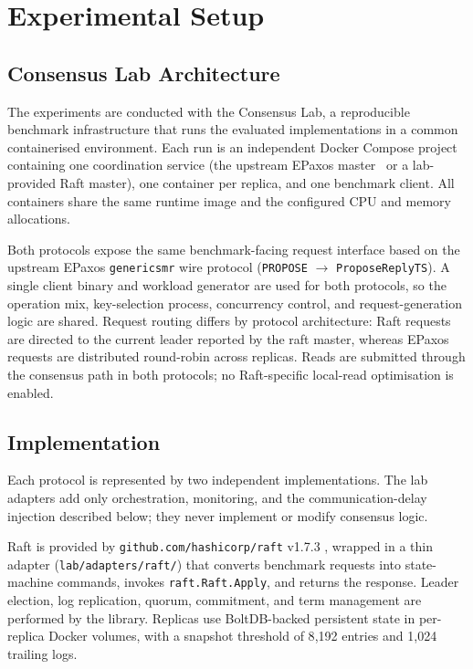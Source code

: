 \section{Experimental Setup}

\label{sec:setup}

\subsection{Consensus Lab Architecture}

The experiments are conducted with the Consensus Lab, a reproducible
benchmark infrastructure that runs the evaluated implementations in a
common containerised environment. Each run is an independent Docker Compose
project containing one coordination service (the upstream EPaxos
master~\cite{moraru2013epaxos} or a lab-provided Raft master), one container
per replica, and one benchmark client. All containers share the same runtime
image and the configured CPU and memory allocations.

Both protocols expose the same benchmark-facing request interface based on
the upstream EPaxos \texttt{genericsmr} wire protocol
(\texttt{PROPOSE} $\rightarrow$ \texttt{ProposeReplyTS}). A single client
binary and workload generator are used for both protocols, so the operation
mix, key-selection process, concurrency control, and request-generation
logic are shared. Request routing differs by protocol architecture: Raft
requests are directed to the current leader reported by the raft master,
whereas EPaxos requests are distributed round-robin across replicas. Reads
are submitted through the consensus path in both protocols; no Raft-specific
local-read optimisation is enabled.

\subsection{Implementation}

Each protocol is represented by two independent implementations. The lab
adapters add only orchestration, monitoring, and the communication-delay
injection described below; they never implement or modify consensus logic.

Raft is provided by \texttt{github.com/hashicorp/raft} v1.7.3
\cite{hashicorpraft}, wrapped in a thin adapter
(\texttt{lab/adapters/raft/}) that converts benchmark requests into
state-machine commands, invokes \texttt{raft.Raft.Apply}, and returns the
response. Leader election, log replication, quorum, commitment, and term
management are performed by the library. Replicas use BoltDB-backed
persistent state in per-replica Docker volumes, with a snapshot threshold of
8{,}192 entries and 1{,}024 trailing logs.

